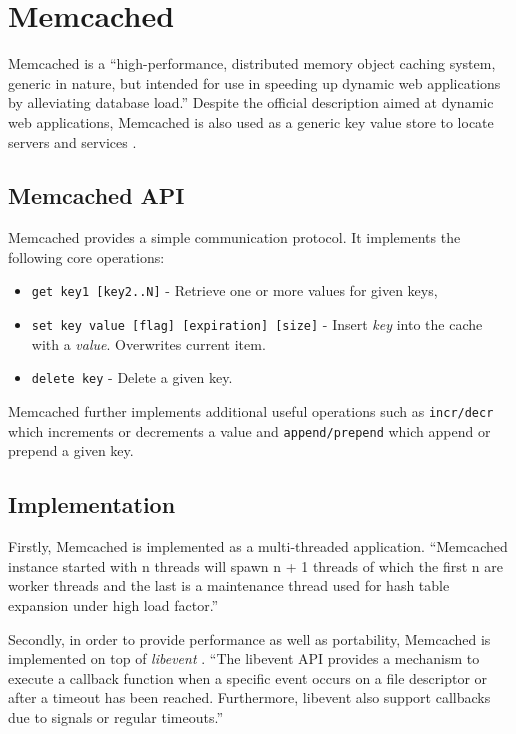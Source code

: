 \section{Memcached}

Memcached is a ``high-performance, distributed memory object caching system, generic in nature, but intended for use in speeding up dynamic web applications by alleviating database load.'' \cite{interactive2006memcached} Despite the official description aimed at dynamic web applications, Memcached is also used as a generic key value store to locate servers and services \cite{atikoglu2012workload}.

\subsection{Memcached API}
Memcached provides a simple communication protocol. It implements the following core operations:

\begin{itemize}
    \item \texttt{get key1 [key2..N]} - Retrieve one or more values for given keys,
    \item \texttt{set key value [flag] [expiration] [size]} - Insert \textit{key} into the cache with a \textit{value}. Overwrites current item.
    \item \texttt{delete key} - Delete a given key.
\end{itemize}

Memcached further implements additional useful operations such as \texttt{incr/decr} which increments or decrements a value and \texttt{append/prepend} which append or prepend a given key.

\subsection{Implementation}
Firstly, Memcached is implemented as a multi-threaded application. ``Memcached instance started with n threads will spawn n + 1 threads of which the first n are worker threads and the last is a maintenance thread used for hash table expansion under high load factor.'' \cite{solarflarememcached}

Secondly, in order to provide performance as well as  portability, Memcached is implemented on top of \textit{libevent} \cite{libevent}. ``The libevent API provides a mechanism to execute a callback function when a specific event occurs on a file descriptor or after a timeout has been reached. Furthermore, libevent also support callbacks due to signals or regular timeouts.'' \cite{libevent}

